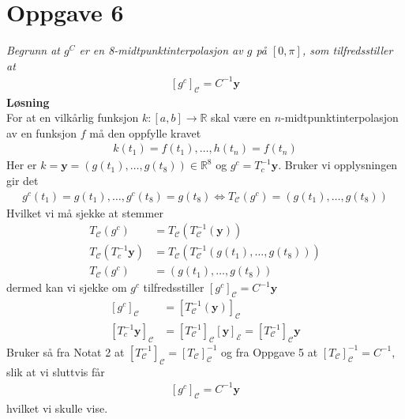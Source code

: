 \documentclass[12pt,
               a4paper,
               article,
               oneside,
               oldfontcommands,
               norsk]{memoir}
\begin{document}
\section*{Oppgave 6}
\emph{Begrunn at $g^{C}$ er en 8-midtpunktinterpolasjon av $g$ på $[0, \pi]$, som tilfredsstiller at}
\begin{align*}
\left[g^{c} \right]_{\mathcal{C}} = C^{-1}\boldsymbol{y}
\end{align*}
\textbf{Løsning}\vspace{3mm}\\
For at en vilkårlig funksjon $k: [a,b] \rightarrow \mathbb{R}$ skal være en $n$-midtpunktinterpolasjon av en funksjon $f$ må den oppfylle kravet
\begin{align*}
k(t_1) = f(t_1), \ldots, h(t_n) = f(t_n)
\end{align*}
Her er $k = \boldsymbol{y}  = \left(g(t_1), \ldots, g(t_8) \right) \in \mathbb{R}^{8}$ og $g^{c} = T_{c}^{-1} \boldsymbol{y}$. Bruker vi opplysningen gir det
\begin{align*}
g^{c}(t_1) = g(t_1), \ldots, g^{c}(t_8) = g(t_8)
\iff
	T_{\mathcal{C}}(g^{c}) = \left( g(t_1), \ldots, g(t_8) \right) 
\end{align*}
Hvilket vi må sjekke at stemmer
\begin{align*}
T_{\mathcal{C}}(g^{c}) &= 
	T_{\mathcal{C}}\left( T_{\mathcal{C}}^{-1}(\boldsymbol{y}) 				\right) \\[5pt]
T_{\mathcal{C}}\left(T_{c}^{-1} \boldsymbol{y} \right) &=
	T_{\mathcal{C}}\left(T_{\mathcal{C}}^{-1} \left( g(t_1), \ldots, g(t_8) \right)\right)\\[5pt]
T_\mathcal{C}(g^{c}) &= (g(t_1), \ldots, g(t_8))
\end{align*}
dermed kan vi sjekke om $g^{c}$ tilfredsstiller $\left[g^{c} \right]_{\mathcal{C}} = C^{-1}\boldsymbol{y}$
\begin{align*}
\left[g^{c} \right]_{\mathcal{C}}  &= 
	\left[ T_{\mathcal{C}}^{-1}(\boldsymbol{y}) \right]_\mathcal{C} \\[5pt]
	\left[T_{c}^{-1} \boldsymbol{y}\right]_\mathcal{C} &= 							\left[T_{\mathcal{C}}^{-1} \right]_\mathcal{C}\left[\boldsymbol{y} \right]_\mathcal{E} 
=
	\left[T_{\mathcal{C}}^{-1} \right]_\mathcal{C} \boldsymbol{y} 
\end{align*}
Bruker så fra Notat 2 at $\left[T^{-1}_{\mathcal{C}} \right]_{\mathcal{C}} = \left[T_{\mathcal{C}}\right]_{\mathcal{C}}^{-1}$ og fra Oppgave 5 at $\left[T_{\mathcal{C}}\right]_{\mathcal{C}}^{-1} = C^{-1}$, slik at vi sluttvis får
\begin{align*}
\left[g^{c} \right]_{\mathcal{C}} = C^{-1}\boldsymbol{y}
\end{align*}
hvilket vi skulle vise.
\end{document}
